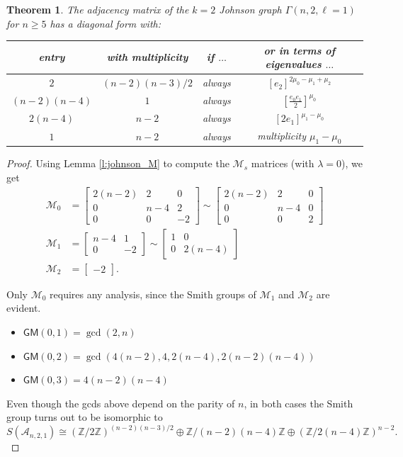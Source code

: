 \documentclass[11pt]{article}
\newtheorem{theorem}[theo]{Theorem}
\theoremstyle{definition}
\numberwithin{equation}{section}
\numberwithin{equation}{section}
\newcommand{\Z}[0]{\mathbb{Z}}
\newcommand{\M}{\mathcal{M}}
\newcommand{\A}{\mathcal{A}}
\newcommand{\GM}{\mathsf{GM}}
\newcommand{\G}[0]{\Gamma}
\begin{document}
\begin{theorem}
The adjacency matrix of the $k=2$ Johnson graph $\G(n, 2, \ell = 1)$ for $n \geq 5$ has a diagonal form with:
\begin{center}
\begin{tabular}{ |c|c|c||c| } 
 \hline
 entry & with multiplicity & if $\ldots$ & or in terms of eigenvalues $\ldots$ \\ 
 \hline
$2$ & $(n-2)(n-3)/2$ & always &  $[e_2]^{2\mu_{0} - \mu_{1} + \mu_{2}}$\\
$(n - 2)(n - 4)$ & $1$ & always & $[\frac{e_{0}e_{1}}{2}]^{\mu_{0}}$ \\
$2(n-4)$ & $n - 2$ & always & $[2e_{1}]^{\mu_{1}-\mu_{0}}$ \\
$1$ & $n-2$ & always & multiplicity $\mu_1 - \mu_0$ \\
 \hline
\end{tabular}
\end{center}
\end{theorem}
\begin{proof} 
 Using Lemma \ref{l:johnson_M} to compute the $\M_s$ matrices (with $\lambda = 0$), we get
\begin{align*}
\M_0 &= \begin{bmatrix} 2(n-2) & 2 & 0 \\ 0 & n-4 & 2 \\ 0 & 0 & -2 \end{bmatrix} \sim \begin{bmatrix} 2(n-2) & 2 & 0 \\ 0 & n-4 & 0 \\ 0 & 0 & 2 \end{bmatrix}\\
 \M_1 &= \begin{bmatrix} n-4 & 1 \\ 0 & -2 \end{bmatrix} \sim \begin{bmatrix} 1 & 0 \\ 0 & 2(n-4) \end{bmatrix}\\
 \M_2 &= \begin{bmatrix} -2 \end{bmatrix}.
 \end{align*}

Only $\M_{0}$ requires any analysis, since the Smith groups of $\M_1$ and $\M_2$ are evident.
\begin{itemize}
    \item $\GM(0, 1) = \gcd(2, n)$
    \item $\GM(0, 2) = \gcd(4(n-2), 4, 2(n-4), 2(n-2)(n-4))$
    \item $\GM(0, 3) =  4(n-2)(n-4)$
\end{itemize}
Even though the gcds above depend on the parity of $n$, in both cases the Smith group turns out to be isomorphic to
\[S(\A_{n,2,1}) \cong \left ( \Z/2\Z \right )^{(n-2)(n-3)/2} \oplus \Z/(n-2)(n-4)\Z \oplus \left ( \Z/2(n-4)\Z \right )^{n-2}.\]
\end{proof}
\end{document}
